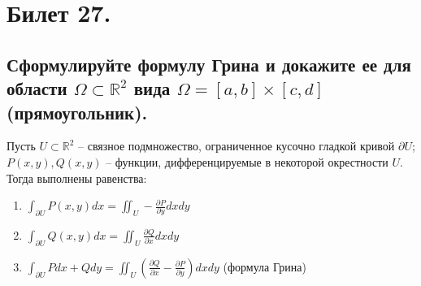 \section{Билет 27.}

\subsection{Сформулируйте формулу Грина и докажите ее для области $\Omega \subset \mathbb{R}^2$ вида $\Omega = [a,b] \times [c, d]$ (прямоугольник).}
\begin{statement}
    Пусть $U \subset \mathbb{R}^2$ -- связное подмножество, ограниченное кусочно гладкой кривой $\partial U$; $P(x,y), Q(x,y)$ -- функции, дифференцируемые в некоторой окрестности $U$. Тогда выполнены равенства:
    \begin{enumerate}
        \item $\int_{\partial U} P(x,y) dx = \iint_U - \frac{\partial P}{\partial y} dx dy$
        \item $\int_{\partial U} Q(x,y) dx = \iint_U \frac{\partial Q}{\partial x} dx dy$
        \item $\int_{\partial U} P dx + Q dy = \iint_U \left(
            \frac{\partial Q}{\partial x} - \frac{\partial P}{\partial y}
        \right) dx dy$ (формула Грина)
    \end{enumerate}
    

\end{statement}
